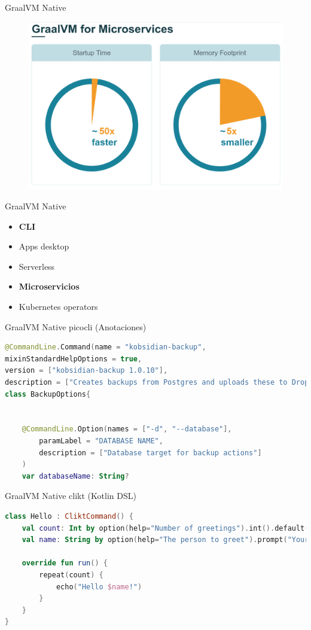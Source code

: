 \documentclass[aspectratio=169]{beamer}
\begin{document}
\begin{frame}{GraalVM Native}
	\begin{figure}
		\centering
		\includegraphics[width=0.7\linewidth]{Images/ventajasnative}
	\end{figure}
\end{frame}


\begin{frame}{GraalVM Native}
	\begin{itemize}
		\item \textbf{CLI}
		\item Apps desktop
    		\item Serverless
		\item \textbf{Microservicios}
        \item Kubernetes operators
	\end{itemize}

\end{frame}

\begin{frame}[fragile]{GraalVM Native}
picocli (Anotaciones)
\begin{lstlisting}[language=Kotlin]
@CommandLine.Command(name = "kobsidian-backup",
mixinStandardHelpOptions = true,
version = ["kobsidian-backup 1.0.10"],
description = ["Creates backups from Postgres and uploads these to Dropbox"])
class BackupOptions{


    @CommandLine.Option(names = ["-d", "--database"],
        paramLabel = "DATABASE NAME",
        description = ["Database target for backup actions"]
    )
    var databaseName: String?
\end{lstlisting}
\end{frame}

\begin{frame}[fragile]{GraalVM Native}
clikt (Kotlin DSL)
\begin{lstlisting}[language=Kotlin]
class Hello : CliktCommand() {
    val count: Int by option(help="Number of greetings").int().default(1)
    val name: String by option(help="The person to greet").prompt("Your name")

    override fun run() {
        repeat(count) {
            echo("Hello $name!")
        }
    }
}
\end{lstlisting}
\end{frame}
\end{document}
